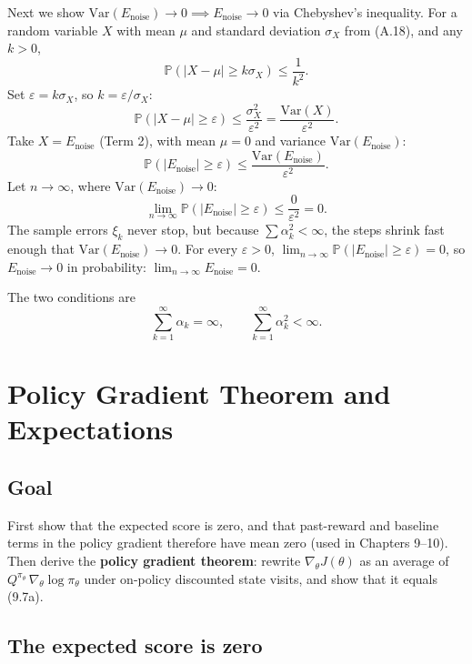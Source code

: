 Next we show $\mathrm{Var}(E_{\text{noise}})\to 0\implies E_{\text{noise}}\to 0$ via Chebyshev's inequality. For a random variable $X$ with mean $\mu$ and standard deviation $\sigma_X$ from (A.18), and any $k>0$,
\begin{equation}
\mathbb{P}(\lvert X-\mu\rvert\ge k\sigma_X)
\le
\frac{1}{k^2}.
\tag{D.10}
\end{equation}
Set $\varepsilon=k\sigma_X$, so $k=\varepsilon/\sigma_X$:
\[
\mathbb{P}(\lvert X-\mu\rvert\ge\varepsilon)
\le
\frac{\sigma_X^2}{\varepsilon^2}
=
\frac{\mathrm{Var}(X)}{\varepsilon^2}.
\]
Take $X=E_{\text{noise}}$ (Term 2), with mean $\mu=0$ and variance $\mathrm{Var}(E_{\text{noise}})$:
\[
\mathbb{P}(\lvert E_{\text{noise}}\rvert\ge\varepsilon)
\le
\frac{\mathrm{Var}(E_{\text{noise}})}{\varepsilon^2}.
\]
Let $n\to\infty$, where $\mathrm{Var}(E_{\text{noise}})\to 0$:
\[
\lim_{n\to\infty}\mathbb{P}(\lvert E_{\text{noise}}\rvert\ge\varepsilon)
\le
\frac{0}{\varepsilon^2}
=
0.
\]
The sample errors $\xi_k$ never stop, but because $\sum\alpha_k^2<\infty$, the steps shrink fast enough that $\mathrm{Var}(E_{\text{noise}})\to 0$. For every $\varepsilon>0$, $\lim_{n\to\infty}\mathbb{P}(\lvert E_{\text{noise}}\rvert\ge\varepsilon)=0$, so $E_{\text{noise}}\to 0$ in probability: $\lim_{n\to\infty}E_{\text{noise}}=0$.

The two conditions are
\begin{equation}
\sum_{k=1}^{\infty}\alpha_k=\infty,
\qquad
\sum_{k=1}^{\infty}\alpha_k^2<\infty.
\tag{D.11}
\end{equation}

\chapter{Policy Gradient Theorem and Expectations}\label{app:E}

\section*{Goal}

First show that the expected score is zero, and that past-reward and baseline terms in the policy gradient therefore have mean zero (used in Chapters 9--10). Then derive the \textbf{policy gradient theorem}: rewrite $\nabla_\theta J(\theta)$ as an average of $Q^{\pi_\theta}\,\nabla_\theta\log\pi_\theta$ under on-policy discounted state visits, and show that it equals (9.7a).

\section{The expected score is zero}

